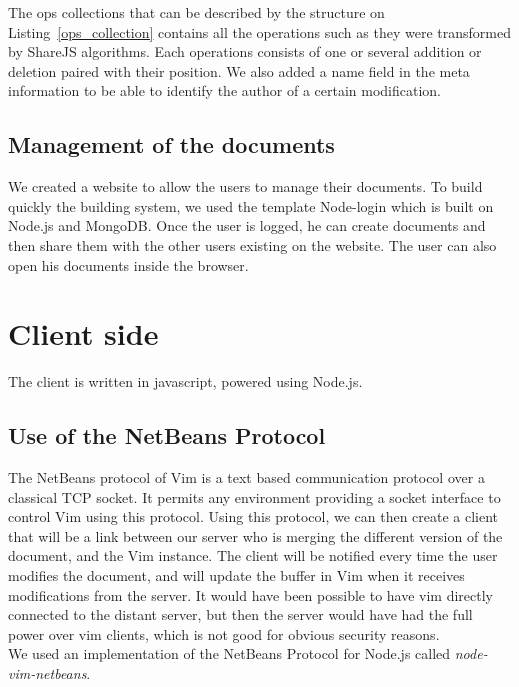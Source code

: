 \documentclass{llncs}
\begin{document}
The ops collections that can be described by the structure on
Listing~\ref{ops_collection} contains all the operations such as they were
transformed by ShareJS algorithms. Each operations consists of one or several
addition or deletion paired with their position. We also added a name field in
the meta information to be able to identify the author of a certain
modification.
%

\subsection{Management of the documents}

We created a website to allow the users to manage their documents.
To build quickly the building system, we used the template Node-login which is built
on Node.js and MongoDB.
Once the user is logged, he can create documents and then share them with the other
users existing on the website. The user can also open his documents inside the browser.

\section{Client side}\label{sec:Others}

The client is written in javascript, powered using Node.js.\cite{nodejs}

\subsection{Use of the NetBeans Protocol}

The NetBeans protocol of Vim is a text based communication protocol over a
classical TCP socket.
It permits any environment providing a socket interface to control Vim using
this protocol.\cite{netbeans} Using this protocol, we can then create a client
that will be a link between our server who is merging the different version of
the document, and the Vim instance.
The client will be notified every time the user modifies the document, and will
update the buffer in Vim when it receives modifications from the server.
It would have been possible to have vim directly connected to the distant
server, but then the server would have had the full power over vim clients,
which is not good for obvious security reasons.\\
We used an implementation of the NetBeans Protocol for Node.js called
\textit{node-vim-netbeans}.\cite{node-vim-netbeans}
\end{document}
